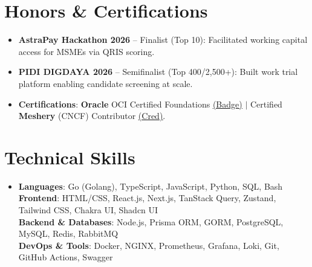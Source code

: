 \documentclass[letterpaper,11pt]{article}
\newcommand{\resumeItem}[1]{\item\small{#1}}
\begin{document}
\section{Honors \& Certifications}
  \begin{itemize}[leftmargin=15pt, label=\tiny$\bullet$, itemsep=0.3pt, parsep=0pt, topsep=0.1pt]
    \resumeItem{\textbf{AstraPay Hackathon 2026} -- Finalist (Top 10): Facilitated working capital access for MSMEs via QRIS scoring.}
    \resumeItem{\textbf{PIDI DIGDAYA 2026} -- Semifinalist (Top 400/2,500+): Built work trial platform enabling candidate screening at scale.}
    \resumeItem{\textbf{Certifications}: \textbf{Oracle} OCI Certified Foundations \href{https://catalog-education.oracle.com/ords/certview/sharebadge_m?id=8B649FA58712B4081E58C95EC3618C77402518C510B850A9C86F02FCB73960A5}{\underline{(Badge)}} $|$ Certified \textbf{Meshery} (CNCF) Contributor \href{https://cloud.meshery.io/academy/certificates/dcd71d58-dd35-45d3-86a9-857ac980e08e}{\underline{(Cred)}}.}
  \end{itemize}\vspace{-3pt}

\section{Technical Skills}
  \begin{itemize}[leftmargin=0in, label={}, itemsep=0.3pt, parsep=0pt, topsep=0.1pt]
    \item\small{
      \textbf{Languages}{: Go (Golang), TypeScript, JavaScript, Python, SQL, Bash} \\
      \textbf{Frontend}{: HTML/CSS, React.js, Next.js, TanStack Query, Zustand, Tailwind CSS, Chakra UI, Shadcn UI} \\
      \textbf{Backend \& Databases}{: Node.js, Prisma ORM, GORM, PostgreSQL, MySQL, Redis, RabbitMQ} \\
      \textbf{DevOps \& Tools}{: Docker, NGINX, Prometheus, Grafana, Loki, Git, GitHub Actions, Swagger}
    }
  \end{itemize}
\end{document}
